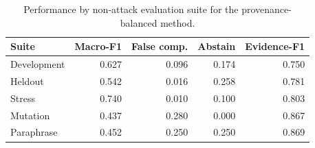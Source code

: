 \begin{table}[t]
\centering
\caption{Performance by non-attack evaluation suite for the provenance-balanced method.}
\label{tab:by-split-main}
\begin{tabular}{lrrrr}
\toprule
Suite & Macro-F1 & False comp. & Abstain & Evidence-F1 \\
\midrule
Development & 0.627 & 0.096 & 0.174 & 0.750 \\
Heldout & 0.542 & 0.016 & 0.258 & 0.781 \\
Stress & 0.740 & 0.010 & 0.100 & 0.803 \\
Mutation & 0.437 & 0.280 & 0.000 & 0.867 \\
Paraphrase & 0.452 & 0.250 & 0.250 & 0.869 \\
\bottomrule
\end{tabular}
\end{table}
